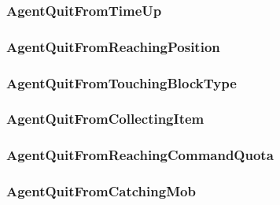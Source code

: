 \documentclass[11pt]{article} %
\begin{document}
\subsubsection{AgentQuitFromTimeUp}
\subsubsection{AgentQuitFromReachingPosition}
\subsubsection{AgentQuitFromTouchingBlockType}
\subsubsection{AgentQuitFromCollectingItem}
\subsubsection{AgentQuitFromReachingCommandQuota}
\subsubsection{AgentQuitFromCatchingMob}
\end{document}
